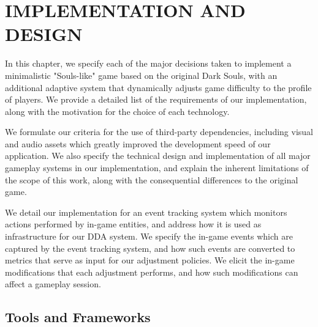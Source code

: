 \chapter{IMPLEMENTATION AND DESIGN}
\label{ch:implementation-design}





In this chapter, we specify each of the major decisions taken to implement a minimalistic "Souls-like" game based on the original Dark Souls, with an additional adaptive system that dynamically adjusts game difficulty to the profile of players. We provide a detailed list of the requirements of our implementation, along with the motivation for the choice of each technology.

We formulate our criteria for the use of third-party dependencies, including visual and audio assets which greatly improved the development speed of our application. We also specify the technical design and implementation of all major gameplay systems in our implementation, and explain the inherent limitations of the scope of this work, along with the consequential differences to the original game. 

We detail our implementation for an event tracking system which monitors actions performed by in-game entities, and address how it is used as infrastructure for our DDA system. We specify the in-game events which are captured by the event tracking system, and how such events are converted to metrics that serve as input for our adjustment policies. We elicit the in-game modifications that each adjustment performs, and how such modifications can affect a gameplay session.


\section{Tools and Frameworks}

